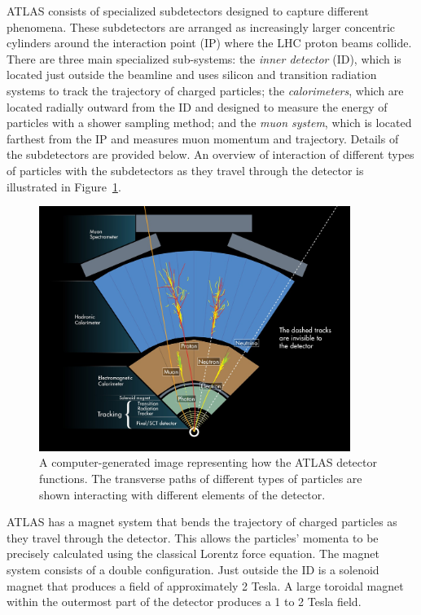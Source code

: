 ATLAS consists of specialized subdetectors designed to capture different phenomena. These subdetectors are arranged as increasingly larger concentric cylinders around the interaction point (IP) where the LHC proton beams collide. There are three main specialized sub-systems: the \emph{inner detector} (ID), which is located just outside the beamline and uses silicon and transition radiation systems to track the trajectory of charged particles; the \emph{calorimeters}, which are located radially outward from the ID and designed to measure the energy of particles with a shower sampling method; and the \emph{muon system}, which is located farthest from the IP and measures muon momentum and trajectory. Details of the subdetectors are provided below. An overview of interaction of different types of particles with the subdetectors as they travel through the detector is illustrated in Figure~\ref{fig:atlas-wedge}.
\begin{figure}[tp]
  \centering
  \includegraphics[width=0.90\textwidth]{fig/atlas/atlas-wedge.jpg}
  \caption{A computer-generated image representing how the ATLAS detector functions. The transverse paths of different types of particles are shown interacting with different elements of the detector\cite{atlas-wedge}.}
  \label{fig:atlas-wedge}
\end{figure}

ATLAS has a magnet system that bends the trajectory of charged particles as they travel through the detector. This allows the particles' momenta to be precisely calculated using the classical Lorentz force equation. The magnet system consists of a double configuration. Just outside the ID is a solenoid magnet that produces a field of approximately 2 Tesla. A large toroidal magnet within the outermost part of the detector produces a 1 to 2 Tesla field.


